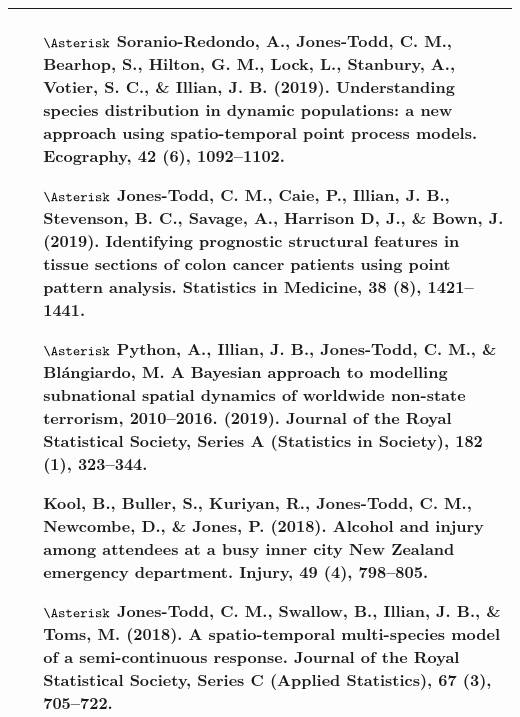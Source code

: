 \documentclass[12pt, a4paper]{article}
\begin{document}
\begin{center}
\begin{longtable}{|p{16.3 cm}|}
\begin{itemize}
\item[$\Asterisk$] Soranio-Redondo, A., {\bf Jones-Todd, C. M.}, Bearhop, S., Hilton, G. M., Lock, L., Stanbury, A., Votier, S. C., \& Illian, J. B. {\bf (2019).} Understanding species distribution in dynamic populations: a new approach using spatio-temporal point process models. Ecography, 42 (6), 1092--1102.
\item[$\Asterisk$] {\bf Jones-Todd, C. M.}, Caie, P., Illian, J. B., Stevenson, B. C., Savage, A., Harrison D, J., \& Bown, J. {\bf (2019).} Identifying prognostic structural features in tissue sections of colon cancer patients using point pattern analysis.
  Statistics in Medicine, 38 (8), 1421--1441.
\item[$\Asterisk$] Python, A., Illian, J. B., {\bf Jones-Todd, C. M.}, \& Bl\'angiardo, M. A Bayesian approach to modelling subnational
  spatial dynamics of worldwide non-state terrorism, 2010–2016. {\bf (2019).} Journal of the Royal Statistical Society,
  Series A (Statistics in Society), 182 (1), 323--344.
\item[] Kool, B., Buller, S., Kuriyan, R., {\bf Jones-Todd, C. M.}, Newcombe, D., \& Jones, P. {\bf (2018).} Alcohol and injury among
  attendees at a busy inner city New Zealand emergency department. Injury, 49 (4), 798--805.
\item[$\Asterisk$] {\bf Jones-Todd, C. M.}, Swallow, B., Illian, J. B., \& Toms, M. {\bf (2018).} A spatio-temporal multi-species model of a
  semi-continuous response. Journal of the Royal Statistical Society, Series C (Applied Statistics), 67 (3), 705--722.
\end{itemize} \\

\hline 

\hline 


\end{longtable}
\end{center}
\end{document}
